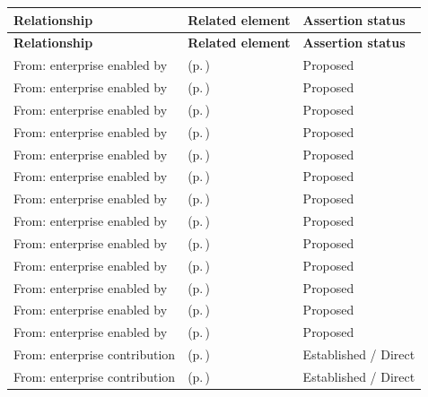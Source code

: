 \begingroup\small\setlength{\TableWidth}{\dimexpr\linewidth-6\tabcolsep-4\arrayrulewidth\relax}
\begin{longtable}{|>{\raggedright\arraybackslash}p{0.27\TableWidth}|>{\raggedright\arraybackslash}p{0.48\TableWidth}|>{\raggedright\arraybackslash}p{0.25\TableWidth}|}
\hline\rowcolor{TableHead}\textbf{Relationship} & \textbf{Related element} & \textbf{Assertion status}\\\hline\endfirsthead
\hline\rowcolor{TableHead}\textbf{Relationship} & \textbf{Related element} & \textbf{Assertion status}\\\hline\endhead
\hline\endfoot
From: enterprise enabled by & \nameref{cap:bec-clinical-record-administration} (p.\,\pageref{cap:bec-clinical-record-administration}) & Proposed\\\hline
From: enterprise enabled by & \nameref{cap:bec-patient-clinical-record} (p.\,\pageref{cap:bec-patient-clinical-record}) & Proposed\\\hline
From: enterprise enabled by & \nameref{cap:bec-care-plan-administration} (p.\,\pageref{cap:bec-care-plan-administration}) & Proposed\\\hline
From: enterprise enabled by & \nameref{cap:bec-primary-care} (p.\,\pageref{cap:bec-primary-care}) & Proposed\\\hline
From: enterprise enabled by & \nameref{cap:bec-acute-care} (p.\,\pageref{cap:bec-acute-care}) & Proposed\\\hline
From: enterprise enabled by & \nameref{cap:bec-emergency-care} (p.\,\pageref{cap:bec-emergency-care}) & Proposed\\\hline
From: enterprise enabled by & \nameref{cap:bec-inpatient-care} (p.\,\pageref{cap:bec-inpatient-care}) & Proposed\\\hline
From: enterprise enabled by & \nameref{cap:bec-community-care} (p.\,\pageref{cap:bec-community-care}) & Proposed\\\hline
From: enterprise enabled by & \nameref{cap:bec-outreach-care} (p.\,\pageref{cap:bec-outreach-care}) & Proposed\\\hline
From: enterprise enabled by & \nameref{cap:bec-remote-virtual-care} (p.\,\pageref{cap:bec-remote-virtual-care}) & Proposed\\\hline
From: enterprise enabled by & \nameref{cap:bec-preventive-care} (p.\,\pageref{cap:bec-preventive-care}) & Proposed\\\hline
From: enterprise enabled by & \nameref{cap:bec-diagnostic-services} (p.\,\pageref{cap:bec-diagnostic-services}) & Proposed\\\hline
From: enterprise enabled by & \nameref{cap:bec-medication-therapy} (p.\,\pageref{cap:bec-medication-therapy}) & Proposed\\\hline
From: enterprise contribution & \nameref{cap:bec-assurance-design} (p.\,\pageref{cap:bec-assurance-design}) & Established / Direct\\\hline
From: enterprise contribution & \nameref{cap:bec-assurance-criteria-management} (p.\,\pageref{cap:bec-assurance-criteria-management}) & Established / Direct\\\hline
\end{longtable}\endgroup

